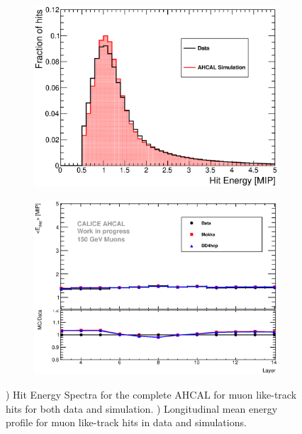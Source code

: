\begin{figure}[htbp!]
	\centering
	\begin{subfigure}[t]{0.49\textwidth}
		\includegraphics[width=1\linewidth]{../Thesis_Plots/EnergyCalib/Plots/ComparisonMCData_MIPPeak.eps}
		\caption{} \label{fig:MIPData_MC}
	\end{subfigure}
	\hfill
	\begin{subfigure}[t]{0.49\textwidth}
		\centering
		\includegraphics[width=1\linewidth]{../Thesis_Plots/EnergyCalib/Plots/ProfileMuons_Edep.eps}
		\caption{} \label{fig:muEdep}
	\end{subfigure}
	\caption{) Hit Energy Spectra for the complete AHCAL for muon like-track hits for both data and simulation. ) Longitudinal mean energy profile for muon like-track hits in data and simulations.}
	\label{fig:Val}
\end{figure}


